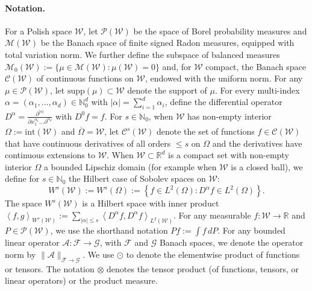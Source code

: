 \documentclass{article}
\theoremstyle{plain}
\theoremstyle{definition}
\theoremstyle{remark}
\newcommand{\R}{\mathbb{R}}
\newcommand{\N}{\mathbb{N}}
\newcommand{\offf}[1]{\left\{#1\right\}}
\newcommand{\cF}{\mathcal{F}}
\newcommand{\cP}{\mathcal{P}}
\newcommand{\cG}{\mathcal{G}}
\newcommand{\cC}{\mathcal{C}}
\newcommand{\cM}{\mathcal{M}}
\newcommand{\cA}{\mathcal{A}}
\newcommand{\ucW}{\mathscr{W}}
\newcommand{\1}{\mathbbm{1}}
\newcommand{\supp}{\text{supp}}
\newcommand{\iprod}[1]{\left\langle #1 \right\rangle}
\theoremstyle{plain}
\theoremstyle{definition}
\begin{document}
\paragraph{Notation.} 
For a Polish space $\ucW$, let $\cP(\ucW)$ be the space of Borel probability measures and $\cM(\ucW)$ be the Banach space of finite signed Radon measures, equipped with total variation norm. We further define the subspace of balanced measures $\cM_0(\ucW) := \{\mu \in \cM(\ucW): \mu(\ucW) = 0\}$ and, for $\ucW$ compact, the Banach space $\cC(\ucW)$ of continuous functions on $\ucW$, endowed with the uniform norm. For any $\mu \in \cP(\ucW)$, let $\supp(\mu) \subset \ucW$ denote the support of $\mu$. For every multi-index $\alpha = (\alpha_1, \dots, \alpha_d) \in \N_0^d$ with $|\alpha| = \sum_{i=1}^d \alpha_i$, define the differential operator $D^\alpha = \frac{\partial^{|\alpha|}}{\partial x_1^{\alpha_1} \dots \partial^{\alpha_d}}$ with $D^0 f = f$. For $s \in \N_0$, when $\ucW$ has non-empty interior $\Omega := \text{int}(\ucW)$ and $\overline{\Omega} = \ucW$, let $\cC^s(\ucW)$ denote the set of functions $f \in \cC(\ucW)$ that have continuous derivatives of all orders $\leq s$ on $\Omega$ and the derivatives have continuous extensions to $\ucW$. When $\ucW \subset \R^d$ is a compact set with non-empty interior $\Omega$ a bounded Lipschiz domain (for example when $\ucW$ is a closed ball), we define for $s \in \N_0$ the Hilbert case of Sobolev spaces on $\ucW$:
\[
W^s(\ucW) := W^s(\Omega) := \offf{f \in L^2(\Omega): D^\alpha f \in L^2(\Omega)}.
\]
The space $W^s(\ucW)$ is a Hilbert space with inner product $\iprod{f, g}_{W^s(\ucW)} := \sum_{|\alpha| \leq s}\iprod{D^\alpha f, D^\alpha f}_{L^2(\ucW)}$. 
For any measurable $f: \ucW \to \R$ and $P \in \cP(\ucW)$, we use the shorthand notation $Pf := \int f \, dP$. For any bounded linear operator $\cA : \cF\to \cG$, with $\cF$ and $\cG$ Banach spaces, we denote the operator norm by $\|\cA\|_{\cF \to \cG}$. We use $\odot$ to denote the elementwise product of functions or tensors. The notation $\otimes$ denotes the tensor product (of functions, tensors, or linear operators) or the product measure.
\end{document}
